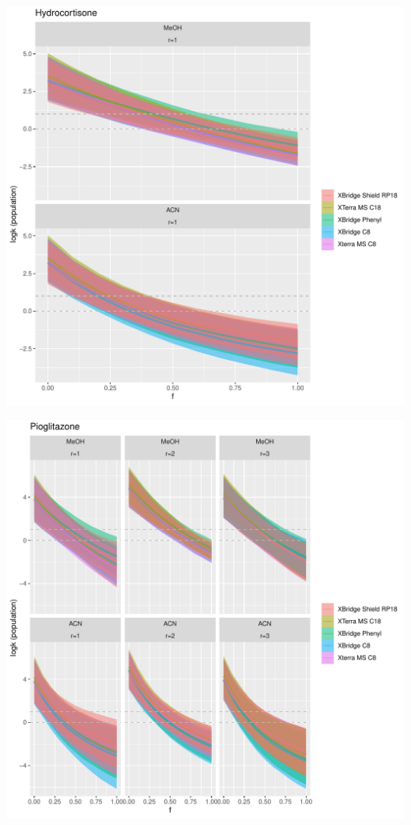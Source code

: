 \documentclass[
]{article}
\begin{document}
\newpage{}

\includegraphics{../figures/izoparam/isopred/Hydrocortisone.population.pdf}

\newpage{}

\includegraphics{../figures/izoparam/isopred/Pioglitazone.population.pdf}
\end{document}
